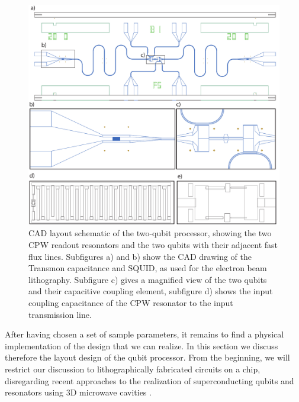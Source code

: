 \begin{figure}[ht!]
	\centering
	\includegraphics[width=\textwidth]{./material/figures/2-qubit-processor/fabrication/qubit_processor_layout}
	\caption[]{CAD layout schematic of the two-qubit processor, showing the two CPW readout resonators and the two qubits with their adjacent fast flux lines. Subfigures a) and b) show the CAD drawing of the Transmon capacitance and SQUID, as used for the electron beam lithography. Subfigure c) gives a magnified view of the two qubits and their capacitive coupling element, subfigure d) shows the input coupling capacitance of the CPW resonator to the input transmission line.}
	\label{fig:processor_fabrication}
\end{figure}

After having chosen a set of sample parameters, it remains to find a physical implementation of the design that we can realize. In this section we discuss therefore the layout design of the qubit processor. From the beginning, we will restrict our discussion to lithographically fabricated circuits on a chip, disregarding recent approaches to the realization of superconducting qubits and resonators using 3D microwave cavities \citep{paik_observation_2011}.

\smallskip

